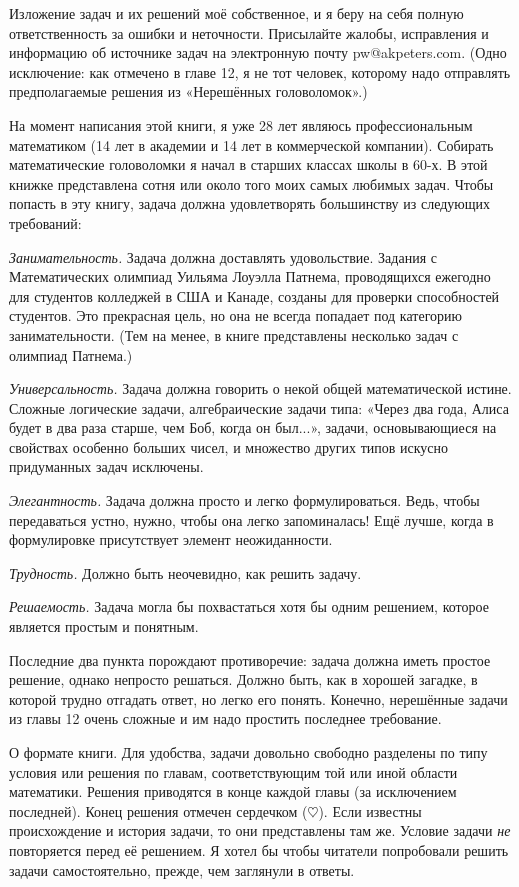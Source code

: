 Изложение задач и их решений моё собственное, и я беру на себя полную ответственность за ошибки и неточности.
Присылайте жалобы, исправления и информацию об источнике задач на электронную почту pw@akpeters.com.
(Одно исключение: как отмечено в главе 12, я не тот человек, которому надо отправлять предполагаемые решения из «Нерешённых головоломок».)

На момент написания этой книги, я уже 28 лет являюсь профессиональным математиком
(14 лет в академии и 14 лет в коммерческой компании).
Собирать математические головоломки я начал в старших классах школы в 60-х.
В этой книжке представлена сотня или около того моих самых любимых задач.
Чтобы попасть в эту книгу, задача должна удовлетворять большинству из следующих требований:

\textit{Занимательность.}
Задача должна доставлять удовольствие.
Задания с Математических олимпиад Уильяма Лоуэлла Патнема, проводящихся ежегодно для студентов колледжей в США и Канаде, созданы для проверки способностей студентов.
Это прекрасная цель, но она не всегда попадает под категорию занимательности.
(Тем на менее, в книге представлены несколько задач с олимпиад Патнема.)

\textit{Универсальность.}
Задача должна говорить о некой общей математической истине.
Сложные логические задачи, алгебраические задачи типа:
«Через два года, Алиса будет в два раза старше, чем Боб, когда он был...», задачи, основывающиеся на свойствах особенно больших  чисел, и множество других типов искусно придуманных задач исключены.

\textit{Элегантность.}
Задача должна  просто и легко формулироваться.
Ведь, чтобы передаваться устно, нужно, чтобы она легко запоминалась! Ещё лучше, когда в формулировке присутствует элемент неожиданности.

\textit{Трудность.}
Должно быть неочевидно, как решить задачу.

\textit{Решаемость.}
Задача могла бы похвастаться хотя бы одним решением, которое является простым и понятным.

Последние два пункта порождают противоречие: задача должна иметь простое решение, однако непросто решаться.
Должно быть, как в хорошей загадке, в которой трудно отгадать ответ, но легко его понять.
Конечно, нерешённые задачи из главы 12 очень сложные и им  надо простить последнее требование.

О формате книги.
Для удобства, задачи довольно свободно разделены по типу условия или решения по главам, соответствующим той или иной области математики.
Решения приводятся в конце каждой главы (за исключением последней).
Конец решения отмечен сердечком ($\heartsuit$).
Если известны происхождение и история задачи, то они представлены там же.
Условие задачи \emph{не} повторяется перед её решением.
Я хотел бы чтобы читатели попробовали решить задачи самостоятельно, прежде, чем заглянули в ответы.

